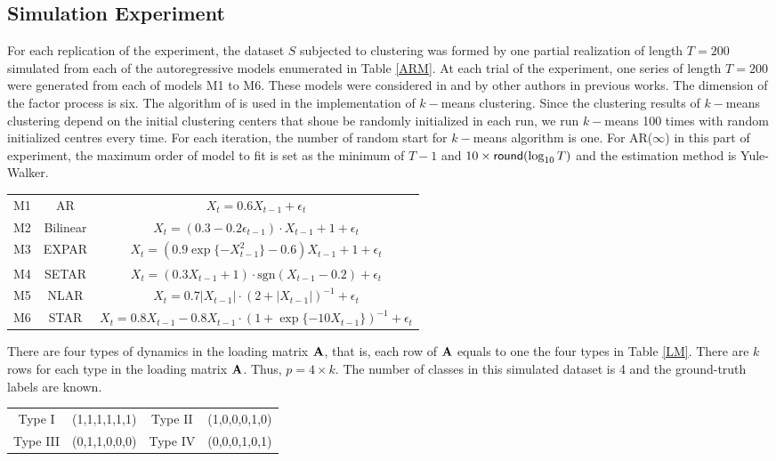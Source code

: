\documentclass{statsoc}
\begin{document}
\subsection{Simulation Experiment}
For each replication of the experiment, the dataset $S$ subjected to clustering was formed by one partial realization of length $T=200$ simulated from each of the autoregressive models enumerated in Table \ref{ARM}. At each trial of the experiment, one series of length $T=200$ were generated from each of models M1 to M6. These models were considered in \citep{nf_10} and by other authors in previous works. The dimension of the factor process is six. The algorithm of \citet{KM_79} is used in the implementation of $k-$means clustering. Since the clustering results of $k-$means clustering depend on the initial clustering centers that shoue be randomly initialized in each run, we run $k-$means 100 times with random initialized centres every time. For each iteration, the number of random start for $k-$means algorithm is one. For AR($\infty$) in this part of experiment, the maximum order of model to fit is set as the minimum of $T-1$ and $10\times{\sf round}(\log_{10} T)$ and the estimation method is Yule-Walker. 
\begin{center}
\begin{tabular}{ccc}
\hline
M1 & AR & $X_t=0.6X_{t-1}+\epsilon_t$ \\
M2 & Bilinear & $X_t=(0.3-0.2\epsilon_{t-1})\cdot X_{t-1}+1+\epsilon_t$ \\
M3 & EXPAR & $X_t=(0.9\exp\{-X_{t-1}^2\}-0.6)X_{t-1}+1+\epsilon_t$ \\
M4 & SETAR & $X_t=(0.3X_{t-1}+1)\cdot \mbox{sgn}(X_{t-1}-0.2)+\epsilon_t$ \\
M5 & NLAR & $X_t=0.7|X_{t-1}|\cdot(2+|X_{t-1}|)^{-1}+\epsilon_t$ \\
M6 & STAR & $X_t=0.8X_{t-1}-0.8X_{t-1}\cdot(1+\exp\{-10X_{t-1}\})^{-1}+\epsilon_t$\\
\hline
\end{tabular}
\end{center}
There are four types of dynamics in the loading matrix ${\bf A}$, that is, each row of $\bf A$ equals to one the four types in Table \ref{LM}. There are $k$ rows for each type in the loading matrix $\bf A$. Thus, $p=4\times k$. The number of classes in this simulated dataset is 4 and the ground-truth labels are known.
\begin{center}
\begin{tabular}{cccc}
\hline
Type I & (1,1,1,1,1,1) & Type II & (1,0,0,0,1,0)\\
Type III & (0,1,1,0,0,0) & Type IV & (0,0,0,1,0,1)\\
\hline
\end{tabular}
\end{center}

\end{document}
